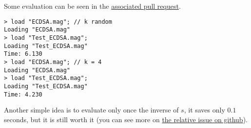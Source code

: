 \documentclass{article}
\theoremstyle{plain}
\theoremstyle{remark}
\theoremstyle{definition}
\begin{document}
Some evaluation can be seen in the \href{https://github.com/giacomoborin/project2_MAGMA/pull/36}{associated pull request}.

\begin{lstlisting}[language = magma]
> load "ECDSA.mag"; // k random
Loading "ECDSA.mag"
> load "Test_ECDSA.mag";
Loading "Test_ECDSA.mag"
Time: 6.130
> load "ECDSA.mag"; // k = 4    
Loading "ECDSA.mag"
> load "Test_ECDSA.mag";
Loading "Test_ECDSA.mag"
Time: 4.230
\end{lstlisting}


Another simple idea is to evaluate only once the inverse of $s$, it saves only $0.1$ seconds, but it is still worth it (you can see more on \href{https://github.com/giacomoborin/project2_MAGMA/issues/13}{the relative issue on github}).


\newpage
\printbibliography
\end{document}
